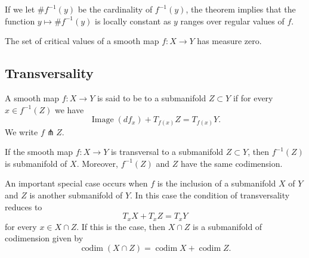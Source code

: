 \documentclass[10pt]{article}
\begin{document}
If we let $\# f^{-1}(y)$ be the cardinality of $f^{-1}(y)$, the theorem implies that the function $y \mapsto \# f^{-1}(y)$ is locally constant as $y$ ranges over regular values of $f$.

\begin{theorem}
    The set of critical values of a smooth map $f: X \rightarrow Y$ has measure zero.
\end{theorem}

\subsection{Transversality}

\begin{definition}[Transversal]
    A smooth map $f: X \rightarrow Y$ is said to be  to a submanifold $Z \subset Y$ if for every $x \in f^{-1}(Z)$ we have
$$
\operatorname{Image}\left(d f_{x}\right)+T_{f(x)} Z=T_{f(x)} Y.
$$
We write $f \pitchfork Z$.
\end{definition}

\begin{theorem}
    If the smooth map $f: X \rightarrow Y$ is transversal to a submanifold $Z \subset Y$, then $f^{-1}(Z)$ is submanifold of $X$. Moreover, $f^{-1}(Z)$ and $Z$ have the same codimension.
\end{theorem}


An important special case occurs when $f$ is the inclusion of a submanifold $X$ of $Y$ and $Z$ is another submanifold of $Y$. In this case the condition of transversality reduces to
$$
T_{x} X+T_{x} Z=T_{x} Y
$$
for every $x \in X \cap Z$. If this is the case, then $X \cap Z$ is a submanifold of codimension given by
$$
\operatorname{codim}(X \cap Z)=\operatorname{codim} X+\operatorname{codim} Z.
$$



\end{document}
